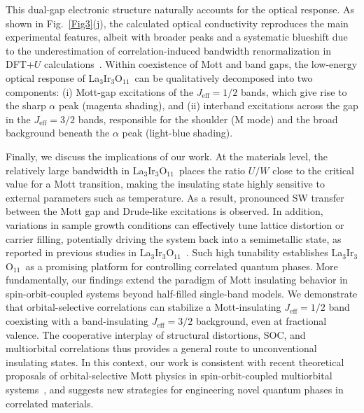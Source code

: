 \documentclass[prl,floatfix,twocolumn,superscriptaddress]{revtex4-2}
\newcommand{\LIO}{La$_3$Ir$_{3}$O$_{11}$}
\begin{document}
This dual-gap electronic structure naturally accounts for the optical response. As shown in Fig.~\ref{Fig3}(j), the calculated optical conductivity reproduces the main experimental features, albeit with broader peaks and a systematic blueshift due to the underestimation of correlation-induced bandwidth renormalization in DFT+$U$ calculations~\cite{Zhang2013}. Within coexistence of Mott and band gaps, the low-energy optical response of \LIO\ can be qualitatively decomposed into two components: (i) Mott-gap excitations of the $J_{\mathrm{eff}} = 1/2$ bands, which give rise to the sharp $\alpha$ peak (magenta shading), and (ii) interband excitations across the gap in the $J_{\mathrm{eff}} = 3/2$ bands, responsible for the shoulder (M mode) and the broad background beneath the $\alpha$ peak (light-blue shading).





Finally, we discuss the implications of our work. At the materials level, the relatively large bandwidth in \LIO\ places the ratio $U/W$ close to the critical value for a Mott transition, making the insulating state highly sensitive to external parameters such as temperature. As a result, pronounced SW transfer between the Mott gap and Drude-like excitations is observed. In addition, variations in sample growth conditions can effectively tune lattice distortion or carrier filling, potentially driving the system back into a semimetallic state, as reported in previous studies in {\LIO}~\cite{Aoyama2019}. Such high tunability establishes \LIO\ as a promising platform for controlling correlated quantum phases. More fundamentally, our findings extend the paradigm of Mott insulating behavior in spin-orbit-coupled systems beyond half-filled single-band models. We demonstrate that orbital-selective correlations can stabilize a Mott-insulating $J_{\mathrm{eff}}=1/2$ band coexisting with a band-insulating $J_{\mathrm{eff}}=3/2$ background, even at fractional valence. The cooperative interplay of structural distortions, SOC, and multiorbital correlations thus provides a general route to unconventional insulating states. In this context, our work is consistent with recent theoretical proposals of orbital-selective Mott physics in spin-orbit-coupled multiorbital systems~\cite{Chen2025,Li2025}, and suggests new strategies for engineering novel quantum phases in correlated materials.
\end{document}
